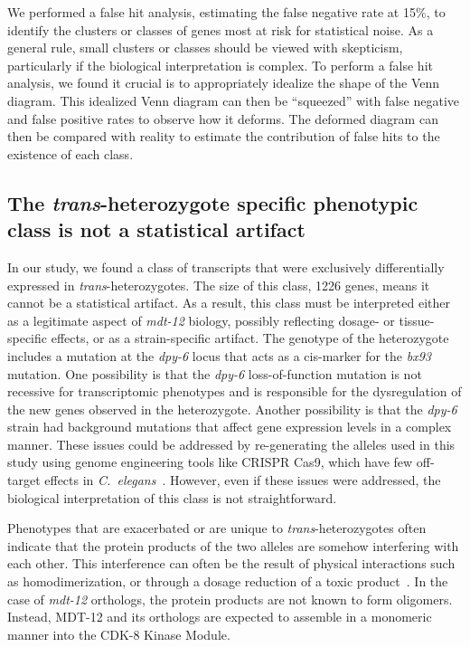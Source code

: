 \documentclass[10pt, twocolumn]{article}
\newcommand{\cel}{\emph{C.~elegans}}
\newcommand{\gene}[1]{\mbox{\emph{#1}}}
\newcommand{\protein}[1]{\mbox{\uppercase{#1}}}
\newcommand{\dpy}{\gene{mdt-12}}
\begin{document}
We performed a false hit analysis, estimating the false negative rate at 15\%,
to identify the clusters or classes of genes most at risk for statistical noise.
As a general rule, small clusters or classes should be viewed with skepticism,
particularly if the biological interpretation is complex. To perform a
false hit analysis, we found it crucial is to appropriately idealize the shape
of the Venn diagram. This idealized Venn diagram can then be ``squeezed'' with
false negative and false positive rates to observe how it deforms. The deformed
diagram can then be compared with reality to estimate the contribution of false
hits to the existence of each class.

\subsection*{The \emph{trans}-heterozygote specific phenotypic class is not a
             statistical artifact}
In our study, we found a class of transcripts that were exclusively
differentially expressed in \emph{trans}-heterozygotes. The size of this class,
1226 genes, means it cannot be a statistical artifact. As a result, this class
must be interpreted either as a legitimate aspect of \dpy{} biology, possibly
reflecting dosage- or tissue-specific effects, or as a strain-specific artifact.
The genotype of the heterozygote includes a mutation at the \gene{dpy-6} locus
that acts as a cis-marker for the \emph{bx93} mutation. One possibility is that
the \emph{dpy-6} loss-of-function mutation is not recessive for transcriptomic
phenotypes and is responsible for the dysregulation of the new genes observed in
the heterozygote. Another possibility is that the \emph{dpy-6} strain had
background mutations that affect gene expression levels in a complex manner.
These issues could be addressed by re-generating the alleles used in this study
using genome engineering tools like CRISPR Cas9, which have few off-target
effects in \cel{}~\cite{Chiu2013}. However, even if these issues were addressed,
the biological interpretation of this class is not straightforward.

Phenotypes that are exacerbated or are unique to \emph{trans}-heterozygotes
often indicate that the protein products of the two alleles are somehow
interfering with each other. This interference can often be the result of
physical interactions such as homodimerization, or through a dosage reduction of
a toxic product~\cite{Yook2005}. In the case of \dpy{} orthologs, the protein
products are not known to form oligomers. Instead, \protein{mdt-12} and its
orthologs are expected to assemble in a monomeric manner into the
\protein{cdk-8} Kinase Module.
\end{document}

